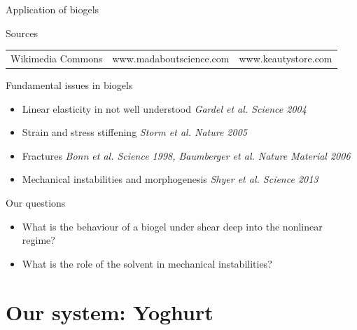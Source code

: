 \documentclass[xcolor=table]{beamer}
\begin{document}
\begin{frame}{Application of biogels}
\begin{footnotesize}
\begin{block}{Sources}
\begin{tabu}{lXl}
Wikimedia Commons & www.madaboutscience.com & www.keautystore.com\\
\end{tabu}
\end{block}
\end{footnotesize}
\end{frame}



\begin{frame}{Fundamental issues in biogels}
\begin{itemize}
\item Linear elasticity in not well understood \textit{\scriptsize Gardel et al. Science 2004}
\item Strain and stress stiffening \textit{\scriptsize Storm et al. Nature 2005}
\item Fractures \textit{\scriptsize Bonn et al. Science 1998, Baumberger et al. Nature Material 2006}
\item Mechanical instabilities and morphogenesis \textit{\scriptsize Shyer et al. Science 2013}
\end{itemize}
\begin{block}{Our questions}
\begin{itemize}
\item What is the behaviour of a biogel under shear deep into the nonlinear regime?
\item What is the role of the solvent in mechanical instabilities?
\end{itemize}
\end{block}
\end{frame}

\section{Our system: Yoghurt}
\end{document}
